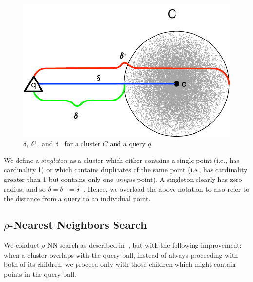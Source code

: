 \begin{figure}[ht!]
    \centering
    \includegraphics[scale=0.5]{images/geometry/deltas.pdf}
    \caption{$\delta$, $\delta^{+}$, and $\delta^{-}$ for a cluster $C$ and a query $q$.}
    \label{fig:methods:deltas}
\end{figure}

We define a \emph{singleton} as a cluster which either contains a single point (i.e., has cardinality 1) or which contains duplicates of the same point (i.e., has cardinality greater than 1 but contains only one \emph{unique} point).
A singleton clearly has zero radius, and so $\delta = \delta^{-} = \delta^{+}$.
Hence, we overload the above notation to also refer to the distance from a query to an individual point.


\subsection{\texorpdfstring{$\rho$}{p}-Nearest Neighbors Search}
\label{subsec:methods:rnn-search}

We conduct $\rho$-NN search as described in~\cite{ishaq2019clustered}, but with the following improvement:
when a cluster overlaps with the query ball, instead of always proceeding with both of its children, we proceed only with those children which might contain points in the query ball.

